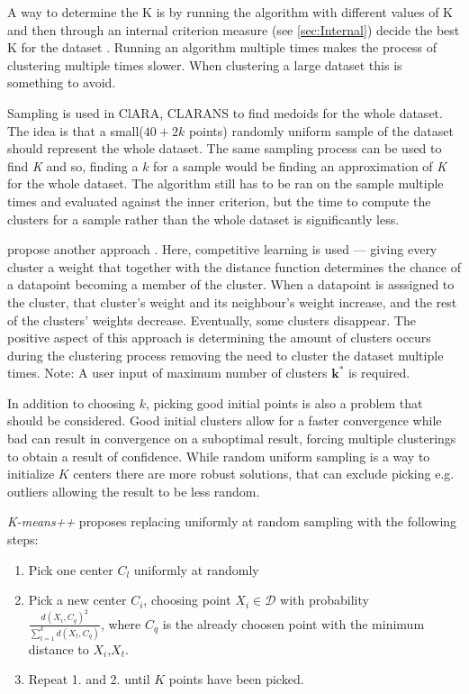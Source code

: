 \documentclass[../report.tex]{subfiles}
\begin{document}
A way to determine the K is by running the algorithm with different values of K and then through an internal criterion measure (see \ref{sec:Internal}) decide the best K for the dataset \cite{Huang97clusteringlarge, Sugar2003}. Running an algorithm multiple times makes the process of clustering multiple times slower. When clustering a large dataset this is something to avoid.

Sampling is used in ClARA, CLARANS \cite{Ng2002} to find medoids for the whole dataset. The idea is that a small($40 + 2k$ points) randomly uniform sample of the dataset should represent the whole dataset. The same sampling process can be used to find \textit{K} and so, finding a ${k}$ for a sample would be finding an approximation of \textit{K} for the whole dataset. The algorithm still has to be ran on the sample multiple times and evaluated against the inner criterion, but the time to compute the clusters for a sample rather than the whole dataset is significantly less.

\citeauthor{Cheung2013} propose another approach \cite{Cheung2013, Jia2018}. Here, competitive learning is used --- giving every cluster a weight that together with the distance function determines the chance of a datapoint becoming a member of the cluster. When a datapoint is asssigned to the cluster, that cluster's weight and its neighbour's weight increase, and the rest of the clusters' weights decrease. Eventually, some clusters disappear. The positive aspect of this approach is determining the amount of clusters occurs during the clustering process removing the need to cluster the dataset multiple times. Note: A user input of maximum number of clusters $\mathbf{k^*}$ is required.

In addition to choosing $k$, picking good initial points is also a problem that should be considered. Good initial clusters allow for a faster convergence while bad can result in convergence on a suboptimal result\cite{Arthur2006, Jia2018}, forcing multiple clusterings to obtain a result of confidence. While random uniform sampling is a way to initialize $K$ centers there are more robust solutions, that can exclude picking e.g. outliers allowing the result to be less random. 

\textit{K-means++} proposes replacing uniformly at random sampling with the following steps:

\begin{enumerate}
  \item Pick one center $C_l$ uniformly at randomly
  \item Pick a new center $C_i$, choosing point $X_i \in \mathcal{D}$ with probability \\ $\frac{d(X_i,C_q)^2}{\sum_{t=1}^{k}{d(X_t,C_q)}}$, where $C_q$ is the already choosen point with the minimum distance to $X_i$,$X_t$.
  \item Repeat 1. and 2. until $K$ points have been picked.
\end{enumerate}
\end{document}
